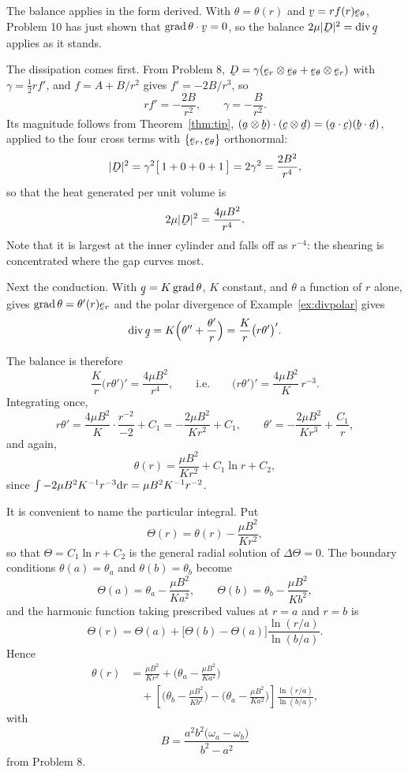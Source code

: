 \begin{solution}
The balance applies in the form derived. With $\theta=\theta(r)$ and
$\bv=rf(r)\bet$, Problem 10 has just shown that $\ip{\grad\theta}\bv=0$,
so the balance $2\mu|\bD|^{2}=\dvg\bq$ applies as it stands.

The dissipation comes first. From Problem 8,
$\bD=\gamma(\ber\otimes\bet+\bet\otimes\ber)$ with
$\gamma=\tfrac12rf'$, and $f=A+B/r^{2}$ gives $f'=-2B/r^{3}$, so
\[
   rf'=-\frac{2B}{r^{2}},
   \qquad
   \gamma=-\frac{B}{r^{2}} .
\]
Its magnitude follows from Theorem~\ref{thm:tip},
$\ip{(\ba\otimes\bb)}{(\bc\otimes\bd)}=(\ip\ba\bc)(\ip\bb\bd)$, applied
to the four cross terms with $\{\ber,\bet\}$ orthonormal:
\[
   |\bD|^{2}=\gamma^{2}\big[\,1+0+0+1\,\big]=2\gamma^{2}
   =\frac{2B^{2}}{r^{4}} ,
\]
so that the heat generated per unit volume is
\[
   2\mu|\bD|^{2}=\frac{4\mu B^{2}}{r^{4}} .
\]
Note that it is largest at the inner cylinder and falls off as
$r^{-4}$: the shearing is concentrated where the gap curves most.

Next the conduction. With $\bq=K\grad\theta$, $K$ constant, and
$\theta$ a function of $r$ alone,  gives
$\grad\theta=\theta'(r)\ber$ and the polar divergence of
Example~\ref{ex:divpolar} gives
\[
   \dvg\bq=K\Big(\theta''+\frac{\theta'}{r}\Big)
   =\frac{K}{r}\big(r\theta'\big)' .
\]

The balance is therefore
\[
   \frac{K}{r}\big(r\theta'\big)'=\frac{4\mu B^{2}}{r^{4}},
   \qquad\text{i.e.}\qquad
   \big(r\theta'\big)'=\frac{4\mu B^{2}}{K}\,r^{-3}.
\]
Integrating once,
\[
   r\theta'=\frac{4\mu B^{2}}{K}\cdot\frac{r^{-2}}{-2}+C_{1}
   =-\frac{2\mu B^{2}}{K r^{2}}+C_{1},
   \qquad
   \theta'=-\frac{2\mu B^{2}}{K r^{3}}+\frac{C_{1}}{r},
\]
and again,
\[
   \theta(r)=\frac{\mu B^{2}}{K r^{2}}+C_{1}\ln r+C_{2},
\]
since $\int-2\mu B^{2}K^{-1}r^{-3}\mathrm{d} r=\mu B^{2}K^{-1}r^{-2}$.

It is convenient to name the particular integral. Put
\[
   \Theta(r)=\theta(r)-\frac{\mu B^{2}}{Kr^{2}} ,
\]
so that $\Theta=C_{1}\ln r+C_{2}$ is the general radial solution of
$\Delta\Theta=0$. The boundary conditions $\theta(a)=\theta_{a}$ and
$\theta(b)=\theta_{b}$ become
\[
   \Theta(a)=\theta_{a}-\frac{\mu B^{2}}{Ka^{2}},
   \qquad
   \Theta(b)=\theta_{b}-\frac{\mu B^{2}}{Kb^{2}} ,
\]
and the harmonic function taking prescribed values at $r=a$ and $r=b$ is
\[
   \Theta(r)=\Theta(a)
   +\big[\Theta(b)-\Theta(a)\big]\frac{\ln(r/a)}{\ln(b/a)} .
\]
Hence
\[
   \boxed{\
   \begin{aligned}
   \theta(r)&=\frac{\mu B^{2}}{Kr^{2}}
   +\Big(\theta_{a}-\frac{\mu B^{2}}{Ka^{2}}\Big)\\
   &\quad+\left[\Big(\theta_{b}-\frac{\mu B^{2}}{Kb^{2}}\Big)
   -\Big(\theta_{a}-\frac{\mu B^{2}}{Ka^{2}}\Big)\right]
   \frac{\ln(r/a)}{\ln(b/a)} ,
   \end{aligned}\ }
\]
with
\[
   B=\frac{a^{2}b^{2}\big(\omega_{a}-\omega_{b}\big)}{b^{2}-a^{2}}
\]
from Problem 8.


\end{solution}
